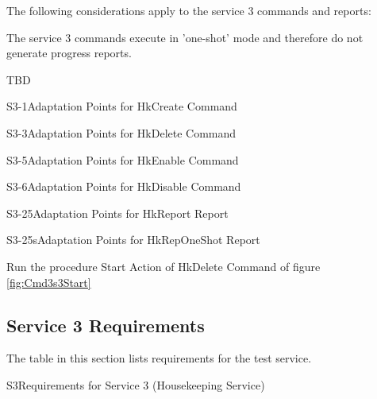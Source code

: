 \documentclass[a4paper,10pt]{article}
\newenvironment{fw_itemize}						%
{\begin{itemize}
  \setlength{\itemsep}{1mm}
  \setlength{\parskip}{0pt}
  \setlength{\parsep}{0pt}}
{\end{itemize}}
\newenvironment{cr_req}[2]
{
\begin{longtable}{|l|p{11.8cm}|}
\caption{#2}\label{tab:Req-#1} \\
\hline
\rowcolor{light-gray}
\textbf{Req. ID} & \textbf{Requirement Text}\\
\hline\hline
\endfirsthead
\rowcolor{light-gray}
\textbf{Req. ID} & \textbf{Requirement Text}\\
\hline\hline
\endhead
\DTLforeach*[\DTLiseq{\cat}{#1}]{dbReq}{\cat=Category,\type=Type,\id=Id,\reqText=Text}
{\DTLiffirstrow{}{\\\hline}P-\cat-\id/\type & \textit{\reqText}}\\\hline
}
{\end{longtable}}
\newenvironment{cr_ap}[2]
{
\begin{longtable}{|l|p{4.7cm}|p{6.9cm}|}
\caption{#2}\label{tab:AP-#1} \\
\hline
\rowcolor{light-gray}
\textbf{AP ID} & \textbf{Adaptation Point} & \textbf{Default Value}\\
\hline\hline
\endfirsthead
\rowcolor{light-gray}
\textbf{AP ID} & \textbf{Adaptation Point} & \textbf{Default Value}\\
\hline\hline
\endhead
\DTLforeach*[\DTLiseq{\cat}{#1}]{dbAP}{\cat=Category,\origin=Origin,\id=Id,\ap=AP,\defValue=DefValue}
{\DTLiffirstrow{}{\\\hline}P-\cat-\id & \ap\ (\origin) & \defValue}\\\hline
}
{\end{longtable}}
\begin{document}
The following considerations apply to the service 3 commands and reports:

\begin{fw_itemize}
\item The service 3 commands execute in 'one-shot' mode and therefore do not generate progress reports.
\item TBD
\end{fw_itemize}

\begin{cr_ap}{S3-1}{Adaptation Points for HkCreate Command}
\end{cr_ap}

\begin{cr_ap}{S3-3}{Adaptation Points for HkDelete Command}
\end{cr_ap}

\begin{cr_ap}{S3-5}{Adaptation Points for HkEnable Command}
\end{cr_ap}

\begin{cr_ap}{S3-6}{Adaptation Points for HkDisable Command}
\end{cr_ap}


\begin{cr_ap}{S3-25}{Adaptation Points for HkReport Report}
\end{cr_ap}

\begin{cr_ap}{S3-25s}{Adaptation Points for HkRepOneShot Report}
\end{cr_ap}

Run the procedure Start Action of HkDelete Command of figure \ref{fig:Cmd3s3Start}


\subsection{Service 3 Requirements}
The table in this section lists requirements for the test service.

\begin{cr_req}{S3}{Requirements for Service 3 (Housekeeping Service)}
\end{cr_req}
\end{document}
